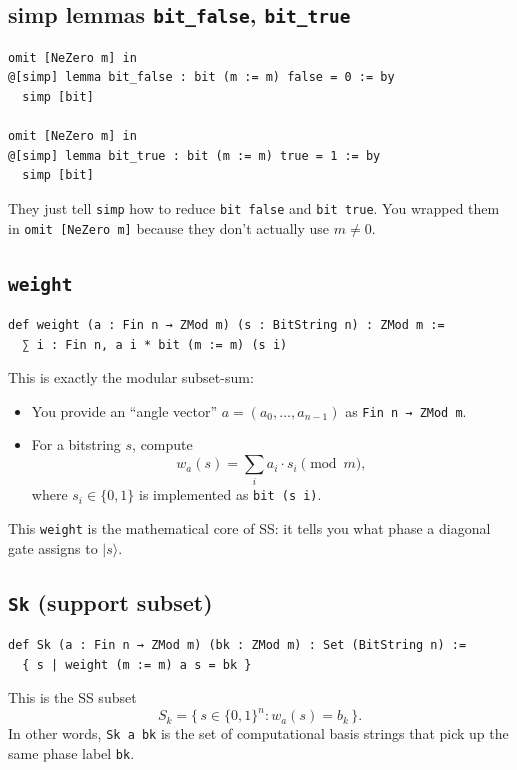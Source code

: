 \documentclass[11pt]{article}
\newcommand{\ket}[1]{\lvert #1 \rangle}
\begin{document}
\subsection*{simp lemmas \texttt{bit\_false}, \texttt{bit\_true}}

\begin{lstlisting}
omit [NeZero m] in
@[simp] lemma bit_false : bit (m := m) false = 0 := by
  simp [bit]

omit [NeZero m] in
@[simp] lemma bit_true : bit (m := m) true = 1 := by
  simp [bit]
\end{lstlisting}

They just tell \texttt{simp} how to reduce \texttt{bit false} and \texttt{bit true}.
You wrapped them in \texttt{omit [NeZero m]} because they don’t actually use $m\neq 0$.

\subsection*{\texttt{weight}}

\begin{lstlisting}
def weight (a : Fin n → ZMod m) (s : BitString n) : ZMod m :=
  ∑ i : Fin n, a i * bit (m := m) (s i)
\end{lstlisting}

This is exactly the modular subset-sum:
\begin{itemize}
\item You provide an “angle vector” $a=(a_0,\dots,a_{n-1})$ as \texttt{Fin n → ZMod m}.
\item For a bitstring $s$, compute
\[
w_a(s)=\sum_i a_i\cdot s_i \pmod m,
\]
where $s_i\in\{0,1\}$ is implemented as \texttt{bit (s i)}.
\end{itemize}

This \texttt{weight} is the mathematical core of SS: it tells you what phase a diagonal gate assigns to $\ket{s}$.

\subsection*{\texttt{Sk} (support subset)}

\begin{lstlisting}
def Sk (a : Fin n → ZMod m) (bk : ZMod m) : Set (BitString n) :=
  { s | weight (m := m) a s = bk }
\end{lstlisting}

This is the SS subset
\[
S_k=\{\, s\in\{0,1\}^n : w_a(s)=b_k \,\}.
\]
In other words, \texttt{Sk a bk} is the set of computational basis strings that pick up the same phase label \texttt{bk}.
\end{document}
